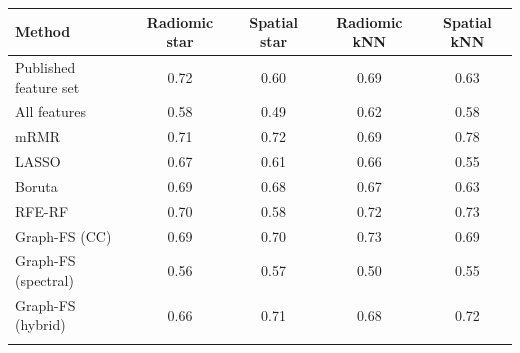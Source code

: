 \begin{tabular}{@{}lcccc@{}}
\toprule
Method & Radiomic star & Spatial star & Radiomic kNN & Spatial kNN \\
\midrule
Published feature set & 0.72 & 0.60 & 0.69 & 0.63 \\
All features & 0.58 & 0.49 & 0.62 & 0.58 \\
mRMR & 0.71 & 0.72 & 0.69 & 0.78 \\
LASSO & 0.67 & 0.61 & 0.66 & 0.55 \\
Boruta & 0.69 & 0.68 & 0.67 & 0.63 \\
RFE-RF & 0.70 & 0.58 & 0.72 & 0.73 \\
Graph-FS (CC) & 0.69 & 0.70 & 0.73 & 0.69 \\
Graph-FS (spectral) & 0.56 & 0.57 & 0.50 & 0.55 \\
Graph-FS (hybrid) & 0.66 & 0.71 & 0.68 & 0.72 \\
\botrule
\end{tabular}
